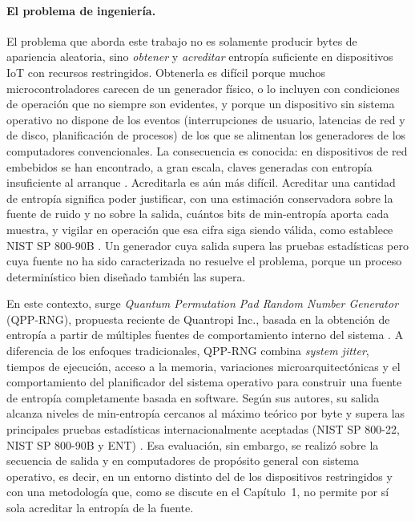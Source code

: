 \paragraph{El problema de ingeniería.} El problema que aborda este trabajo no es solamente producir bytes de apariencia aleatoria, sino \emph{obtener} y \emph{acreditar} entropía suficiente en dispositivos IoT con recursos restringidos. Obtenerla es difícil porque muchos microcontroladores carecen de un generador físico, o lo incluyen con condiciones de operación que no siempre son evidentes, y porque un dispositivo sin sistema operativo no dispone de los eventos (interrupciones de usuario, latencias de red y de disco, planificación de procesos) de los que se alimentan los generadores de los computadores convencionales. La consecuencia es conocida: en dispositivos de red embebidos se han encontrado, a gran escala, claves generadas con entropía insuficiente al arranque \cite{Heninger2012MiningPsQs,Mowery2013Entropics}. Acreditarla es aún más difícil. Acreditar una cantidad de entropía significa poder justificar, con una estimación conservadora sobre la fuente de ruido y no sobre la salida, cuántos bits de min-entropía aporta cada muestra, y vigilar en operación que esa cifra siga siendo válida, como establece NIST SP 800-90B \cite{Turan2018RecommendationGeneration}. Un generador cuya salida supera las pruebas estadísticas pero cuya fuente no ha sido caracterizada no resuelve el problema, porque un proceso determinístico bien diseñado también las supera.

En este contexto, surge \textit{Quantum Permutation Pad Random Number Generator} (QPP-RNG), propuesta reciente de Quantropi Inc., basada en la obtención de entropía a partir de múltiples fuentes de comportamiento interno del sistema \cite{Kuang2025QPP-RNG:Randomness,Kuang2025IID-BasedJitter}. A diferencia de los enfoques tradicionales, QPP-RNG combina \textit{system jitter}, tiempos de ejecución, acceso a la memoria, variaciones microarquitectónicas y el comportamiento del planificador del sistema operativo para construir una fuente de entropía completamente basada en software. Según sus autores, su salida alcanza niveles de min-entropía cercanos al máximo teórico por byte y supera las principales pruebas estadísticas internacionalmente aceptadas (NIST SP 800-22, NIST SP 800-90B y ENT) \cite{Vrana2025RawEvaluation,Walker2008ENT:Program}. Esa evaluación, sin embargo, se realizó sobre la secuencia de salida y en computadores de propósito general con sistema operativo, es decir, en un entorno distinto del de los dispositivos restringidos y con una metodología que, como se discute en el Capítulo~1, no permite por sí sola acreditar la entropía de la fuente.

